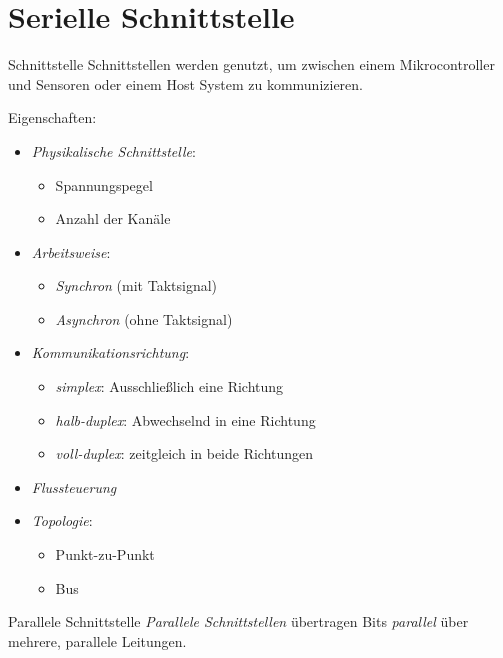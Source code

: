 \section{Serielle Schnittstelle}

\begin{defi}{Schnittstelle}
    Schnittstellen werden genutzt, um zwischen einem Mikrocontroller und Sensoren oder einem Host System zu kommunizieren.

    Eigenschaften:
    \begin{itemize}
        \item \emph{Physikalische Schnittstelle}:
              \begin{itemize}
                  \item Spannungspegel
                  \item Anzahl der Kanäle
              \end{itemize}
        \item \emph{Arbeitsweise}:
              \begin{itemize}
                  \item \emph{Synchron} (mit Taktsignal)
                  \item \emph{Asynchron} (ohne Taktsignal)
              \end{itemize}
        \item \emph{Kommunikationsrichtung}:
              \begin{itemize}
                  \item \emph{simplex}: Ausschließlich eine Richtung
                  \item \emph{halb-duplex}: Abwechselnd in eine Richtung
                  \item \emph{voll-duplex}: zeitgleich in beide Richtungen
              \end{itemize}
        \item \emph{Flussteuerung}
        \item \emph{Topologie}:
              \begin{itemize}
                  \item Punkt-zu-Punkt
                  \item Bus
              \end{itemize}
    \end{itemize}
\end{defi}

\begin{defi}{Parallele Schnittstelle}
    \emph{Parallele Schnittstellen} übertragen Bits \emph{parallel} über mehrere, parallele Leitungen.
\end{defi}

